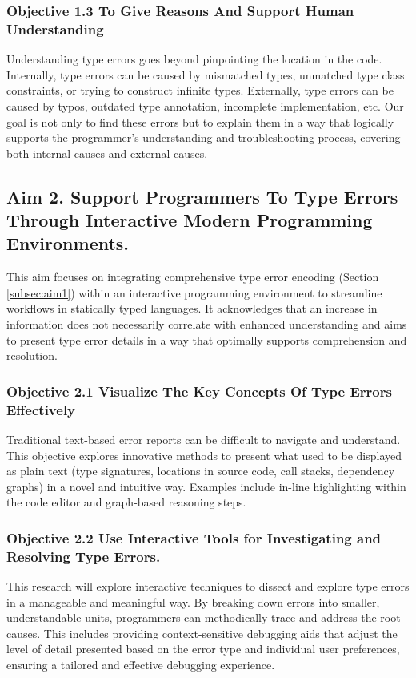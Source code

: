 \subsubsection{Objective 1.3 To Give Reasons And Support Human Understanding}
Understanding type errors goes beyond pinpointing the location in the code. Internally, type errors can be caused by mismatched types, unmatched type class constraints, or trying to construct infinite types. Externally, type errors can be caused by typos, outdated type annotation, incomplete implementation, etc. Our goal is not only to find these errors but to explain them in a way that logically supports the programmer's understanding and troubleshooting process, covering both internal causes and external causes.



\subsection{Aim 2. Support Programmers To Type Errors Through Interactive Modern Programming Environments.}

This aim focuses on integrating comprehensive type error encoding (Section \ref{subsec:aim1}) within an interactive programming environment to streamline workflows in statically typed languages. It acknowledges that an increase in information does not necessarily correlate with enhanced understanding and aims to present type error details in a way that optimally supports comprehension and resolution.

\subsubsection{Objective 2.1 Visualize The Key Concepts Of Type Errors Effectively}

Traditional text-based error reports can be difficult to navigate and understand. This objective explores innovative methods to present what used to be displayed as plain text (type signatures, locations in source code, call stacks, dependency graphs) in a novel and intuitive way. Examples include in-line highlighting within the code editor and graph-based reasoning steps.  

\subsubsection{Objective 2.2 Use Interactive Tools for Investigating and Resolving Type Errors.}

This research will explore interactive techniques to dissect and explore type errors in a manageable and meaningful way. By breaking down errors into smaller, understandable units, programmers can methodically trace and address the root causes. This includes providing context-sensitive debugging aids that adjust the level of detail presented based on the error type and individual user preferences, ensuring a tailored and effective debugging experience.



